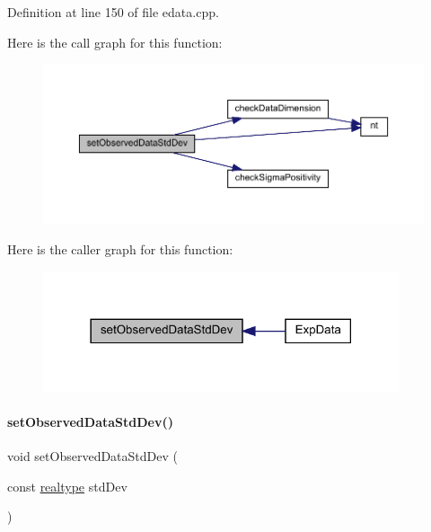 Definition at line 150 of file edata.\+cpp.

Here is the call graph for this function\+:
\nopagebreak
\begin{figure}[H]
\begin{center}
\leavevmode
\includegraphics[width=350pt]{classamici_1_1_exp_data_a5d84a162eb705e032820acd004603f29_cgraph}
\end{center}
\end{figure}
Here is the caller graph for this function\+:
\nopagebreak
\begin{figure}[H]
\begin{center}
\leavevmode
\includegraphics[width=297pt]{classamici_1_1_exp_data_a5d84a162eb705e032820acd004603f29_icgraph}
\end{center}
\end{figure}
\mbox{\label{classamici_1_1_exp_data_ae6ed832b9bee1861d233c90d5a37c677}} 
\paragraph{\texorpdfstring{set\+Observed\+Data\+Std\+Dev()}{setObservedDataStdDev()}\hspace{0.1cm}{\footnotesize\ttfamily [2/4]}}
{\footnotesize\ttfamily void set\+Observed\+Data\+Std\+Dev (\begin{DoxyParamCaption}\item[{const \mbox{\hyperlink{namespaceamici_a1bdce28051d6a53868f7ccbf5f2c14a3}{realtype}}}]{std\+Dev }\end{DoxyParamCaption})}

